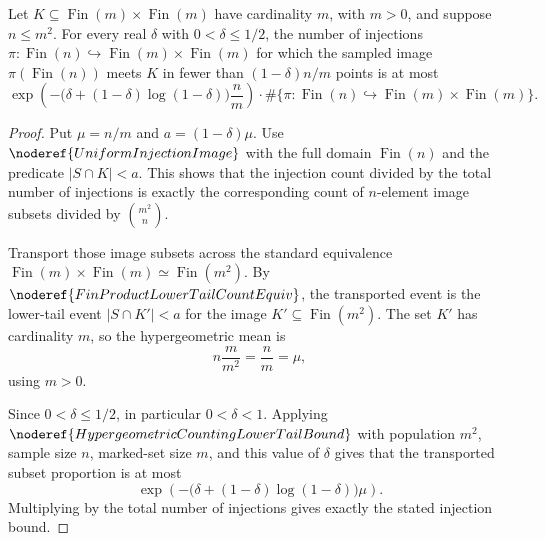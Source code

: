 \begin{lemma}
Let \(K\subseteq \operatorname{Fin}(m)\times \operatorname{Fin}(m)\) have
cardinality \(m\), with \(m>0\), and suppose \(n\le m^2\).  For every real
\(\delta\) with \(0<\delta\le 1/2\), the number of injections
\(\pi:\operatorname{Fin}(n)\hookrightarrow
\operatorname{Fin}(m)\times\operatorname{Fin}(m)\) for which the sampled image
\(\pi(\operatorname{Fin}(n))\) meets \(K\) in fewer than
\((1-\delta)n/m\) points is at most
\[
\exp\!\left(
-\bigl(\delta+(1-\delta)\log(1-\delta)\bigr)\frac{n}{m}
\right)
\cdot
\#\{\pi:\operatorname{Fin}(n)\hookrightarrow
\operatorname{Fin}(m)\times\operatorname{Fin}(m)\}.
\]
\end{lemma}
\begin{proof}
Put \(\mu=n/m\) and \(a=(1-\delta)\mu\).  Use
\(\noderef{UniformInjectionImage}\) with the full domain
\(\operatorname{Fin}(n)\) and the predicate \(|S\cap K|<a\).  This shows that
the injection count divided by the total number of injections is exactly the
corresponding count of \(n\)-element image subsets divided by \(\binom{m^2}{n}\).

Transport those image subsets across the standard equivalence
\(\operatorname{Fin}(m)\times\operatorname{Fin}(m)\simeq
\operatorname{Fin}(m^2)\).  By
\(\noderef{FinProductLowerTailCountEquiv}\), the transported event is the
lower-tail event \(|S\cap K'|<a\) for the image \(K'\subseteq
\operatorname{Fin}(m^2)\).  The set \(K'\) has cardinality \(m\), so the
hypergeometric mean is
\[
n\frac{m}{m^2}=\frac{n}{m}=\mu,
\]
using \(m>0\).

Since \(0<\delta\le 1/2\), in particular \(0<\delta<1\).  Applying
\(\noderef{HypergeometricCountingLowerTailBound}\) with population \(m^2\),
sample size \(n\), marked-set size \(m\), and this value of \(\delta\) gives
that the transported subset proportion is at most
\[
\exp\!\left(
-\bigl(\delta+(1-\delta)\log(1-\delta)\bigr)\mu
\right).
\]
Multiplying by the total number of injections gives exactly the stated
injection bound.
\end{proof}
